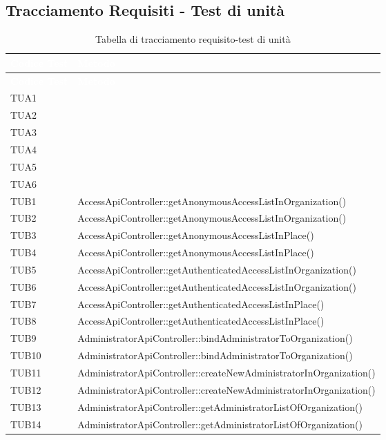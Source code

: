 \subsection{Tracciamento Requisiti - Test di unità}
{
	\renewcommand{\arraystretch}{1.5}
	\centering
	\begin{longtable}{C{2cm} C{12cm}}
		\caption{Tabella di tracciamento requisito-test di unità}\\
		\textcolor{white}{\textbf{Codice Test}} & \textcolor{white}{\textbf{Metodo}}\\	
		\endfirsthead
		\textcolor{white}{\textbf{Codice Test}} & \textcolor{white}{\textbf{Metodo}}\\	
		\endhead
		TUA1 & \\
		TUA2 & \\
		TUA3 & \\
		TUA4 & \\
		TUA5 & \\
		TUA6 & \\
		TUB1 & AccessApiController::getAnonymousAccessListInOrganization()\\
		TUB2 & AccessApiController::getAnonymousAccessListInOrganization()\\
		TUB3 & AccessApiController::getAnonymousAccessListInPlace()\\
		TUB4 & AccessApiController::getAnonymousAccessListInPlace()\\
		TUB5 & AccessApiController::getAuthenticatedAccessListInOrganization()\\
		TUB6 & AccessApiController::getAuthenticatedAccessListInOrganization()\\
		TUB7 & AccessApiController::getAuthenticatedAccessListInPlace()\\
		TUB8 & AccessApiController::getAuthenticatedAccessListInPlace()\\
		TUB9 & AdministratorApiController::bindAdministratorToOrganization()\\
		TUB10 & AdministratorApiController::bindAdministratorToOrganization()\\
		TUB11 & AdministratorApiController::createNewAdministratorInOrganization()\\
		TUB12 & AdministratorApiController::createNewAdministratorInOrganization()\\
		TUB13 & AdministratorApiController::getAdministratorListOfOrganization()\\
		TUB14 & AdministratorApiController::getAdministratorListOfOrganization()\\

\end{longtable}}
